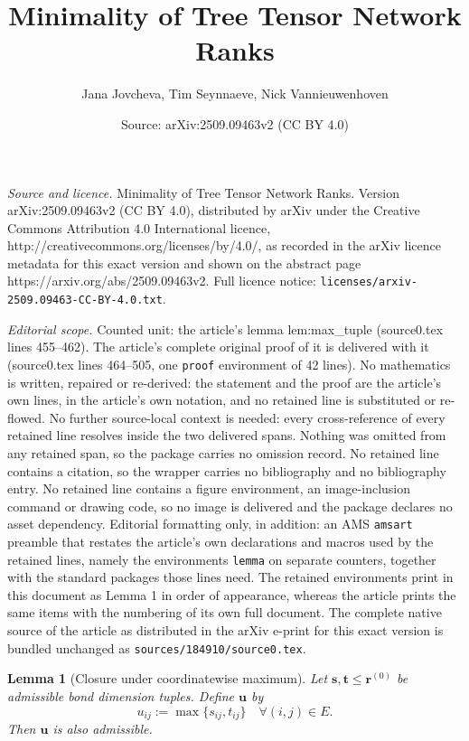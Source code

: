 \documentclass[10pt,a4paper]{amsart}
\title{Minimality of Tree Tensor Network Ranks}
\author{Jana Jovcheva, Tim Seynnaeve, Nick Vannieuwenhoven}
\date{Source: arXiv:2509.09463v2 (CC BY 4.0)}
\newtheorem{lemma}{Lemma}
\begin{document}
\maketitle

\noindent\emph{Source and licence.} Minimality of Tree Tensor Network Ranks. Version arXiv:2509.09463v2 (CC BY 4.0), distributed by arXiv under the Creative Commons Attribution 4.0 International licence, http://creativecommons.org/licenses/by/4.0/, as recorded in the arXiv licence metadata for this exact version and shown on the abstract page https://arxiv.org/abs/2509.09463v2. Full licence notice: \texttt{licenses/arxiv-2509.09463-CC-BY-4.0.txt}.\par\smallskip

\noindent\textit{Editorial scope.} Counted unit: the article's lemma lem:max\_tuple (source0.tex lines 455--462). The article's complete original proof of it is delivered with it (source0.tex lines 464--505, one \texttt{proof} environment of 42 lines). No mathematics is written, repaired or re-derived: the statement and the proof are the article's own lines, in the article's own notation, and no retained line is substituted or re-flowed.  No further source-local context is needed: every cross-reference of every retained line resolves inside the two delivered spans.  Nothing was omitted from any retained span, so the package carries no omission record.  No retained line contains a citation, so the wrapper carries no bibliography and no bibliography entry.  No retained line contains a figure environment, an image-inclusion command or drawing code, so no image is delivered and the package declares no asset dependency.  Editorial formatting only, in addition: an AMS \texttt{amsart} preamble that restates the article's own declarations and macros used by the retained lines, namely the environments \texttt{lemma} on separate counters, together with the standard packages those lines need.  The retained environments print in this document as Lemma 1 in order of appearance, whereas the article prints the same items with the numbering of its own full document.  The complete native source of the article as distributed in the arXiv e-print for this exact version is bundled unchanged as \texttt{sources/184910/source0.tex}.
\begin{lemma}[Closure under coordinatewise maximum]\label{lem:max_tuple}
Let $\mathbf s,\mathbf t \le \mathbf r^{(0)}$ be admissible bond dimension tuples. Define $\mathbf u$ by
\begin{equation}\label{eq:u_ij}
u_{ij} := \max\{s_{ij},t_{ij}\}
\quad \forall(i,j)\in E.
\end{equation}
Then $\mathbf u$ is also admissible.
\end{lemma}
\end{document}

